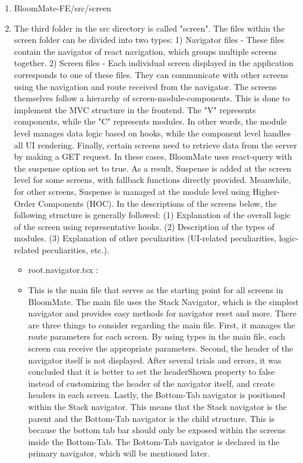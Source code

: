 \documentclass[conference, a4paper]{IEEEtran}
\begin{document}
\begin{enumerate}
\begin{enumerate}
    \item BloomMate-FE/src/screen
    \item[] The third folder in the src directory is called "screen". The files within the screen folder can be divided into two types: 1) Navigator files - These files contain the navigator of react navigation, which groups multiple screens together. 2) Screen files - Each individual screen displayed in the application corresponds to one of these files. They can communicate with other screens using the navigation and route received from the navigator. The screens themselves follow a hierarchy of screen-module-components. This is done to implement the MVC structure in the frontend. The "V" represents components, while the "C" represents modules. In other words, the module level manages data logic based on hooks, while the component level handles all UI rendering. Finally, certain screens need to retrieve data from the server by making a GET request. In these cases, BloomMate uses react-query with the suspense option set to true. As a result, Suspense is added at the screen level for some screens, with fallback functions directly provided. Meanwhile, for other screens, Suspense is managed at the module level using Higher-Order Components (HOC). In the descriptions of the screens below, the following structure is generally followed: (1) Explanation of the overall logic of the screen using representative hooks. (2) Description of the types of modules. (3) Explanation of other peculiarities (UI-related peculiarities, logic-related peculiarities, etc.).

    \begin{itemize}
        \item root.navigator.tsx :
        \item[] This is the main file that serves as the starting point for all screens in BloomMate. The main file uses the Stack Navigator, which is the simplest navigator and provides easy methods for navigator reset and more. There are three things to consider regarding the main file. First, it manages the route parameters for each screen. By using types in the main file, each screen can receive the appropriate parameters. Second, the header of the navigator itself is not displayed. After several trials and errors, it was concluded that it is better to set the headerShown property to false instead of customizing the header of the navigator itself, and create headers in each screen. Lastly, the Bottom-Tab navigator is positioned within the Stack navigator. This means that the Stack navigator is the parent and the Bottom-Tab navigator is the child structure. This is because the bottom tab bar should only be exposed within the screens inside the Bottom-Tab. The Bottom-Tab navigator is declared in the primary navigator, which will be mentioned later. \\


\end{itemize}
\end{enumerate}
\end{enumerate}
\end{document}

